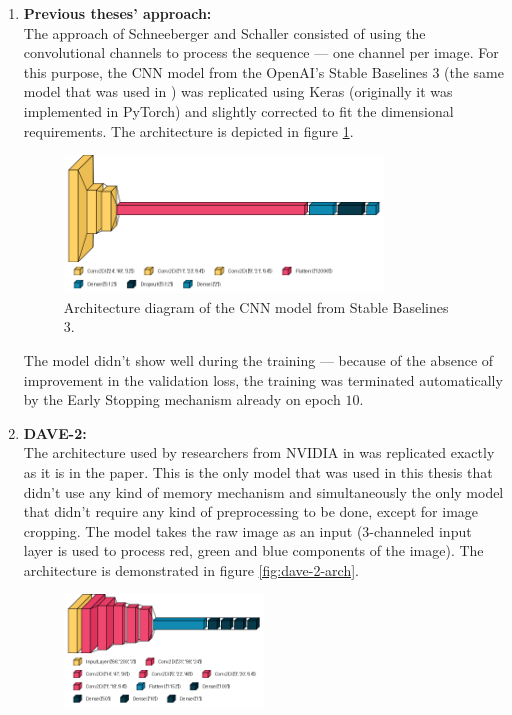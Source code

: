 \begin{enumerate}
  \item \textbf{Previous theses' approach:} \\
    The approach of Schneeberger \autocite{schneeberger2024end} and Schaller \autocite{schaller2023train} consisted of using the convolutional channels to process the sequence --- one channel per image. For this purpose, the CNN model from the OpenAI's Stable Baselines 3 (the same model that was used in \autocite{schneeberger2024end}) was replicated using Keras (originally it was implemented in PyTorch) and slightly corrected to fit the dimensional requirements. The architecture is depicted in figure \ref{fig:sb3cnn-arch}.
    \begin{figure}[htbp]
      \centering
      \includegraphics[width=0.8\textwidth]{Images/SB3CNN_architecture.png}
      \caption{Architecture diagram of the CNN model from Stable Baselines 3.}
      \label{fig:sb3cnn-arch}
    \end{figure}
    The model didn't show well during the training --- because of the absence of improvement in the validation loss, the training was terminated automatically by the Early Stopping mechanism already on epoch $10$.
  \item \textbf{DAVE-2:} \\
    The architecture used by researchers from NVIDIA in \autocite{bojarski2016endendlearningselfdriving} was replicated exactly as it is in the paper. This is the only model that was used in this thesis that didn't use any kind of memory mechanism and simultaneously the only model that didn't require any kind of preprocessing to be done, except for image cropping. The model takes the raw image as an input (3-channeled input layer is used to process red, green and blue components of the image). The architecture is demonstrated in figure \ref{fig:dave-2-arch}.
    \begin{figure}[htbp]
      \centering
      \includegraphics[width=0.5\textwidth]{Images/DAVE-2_architecture.png}

\end{figure}
\end{enumerate}
